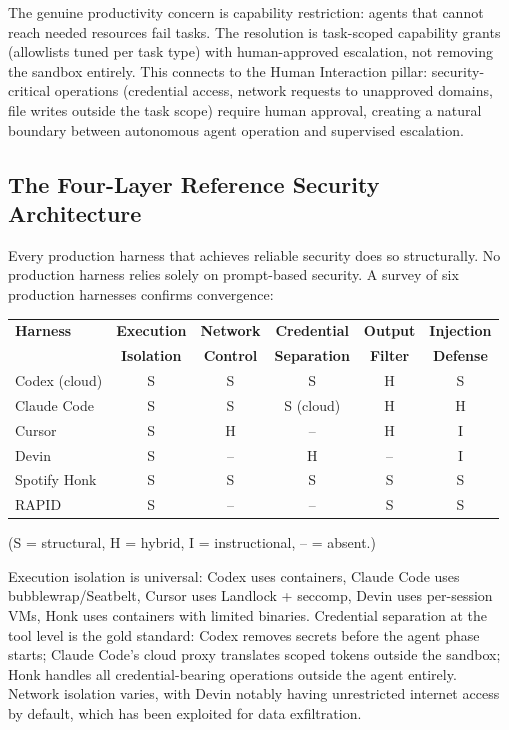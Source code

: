 \documentclass[11pt, a4paper]{googledeepmind}
\begin{document}
The genuine productivity concern is capability restriction: agents that cannot reach needed resources fail tasks. The resolution is task-scoped capability grants (allowlists tuned per task type) with human-approved escalation, not removing the sandbox entirely. This connects to the Human Interaction pillar: security-critical operations (credential access, network requests to unapproved domains, file writes outside the task scope) require human approval, creating a natural boundary between autonomous agent operation and supervised escalation.

\subsection{The Four-Layer Reference Security Architecture}

Every production harness that achieves reliable security does so structurally. No production harness relies solely on prompt-based security. A survey of six production harnesses confirms convergence:

\begin{center}
\small
\begin{tabular}{lccccc}
\toprule
\textbf{Harness} & \textbf{Execution} & \textbf{Network} & \textbf{Credential} & \textbf{Output} & \textbf{Injection} \\
 & \textbf{Isolation} & \textbf{Control} & \textbf{Separation} & \textbf{Filter} & \textbf{Defense} \\
\midrule
Codex (cloud) & S & S & S & H & S \\
Claude Code & S & S & S (cloud) & H & H \\
Cursor & S & H & -- & H & I \\
Devin & S & -- & H & -- & I \\
Spotify Honk & S & S & S & S & S \\
RAPID & S & -- & -- & S & S \\
\bottomrule
\end{tabular}
\end{center}
\noindent\small{(S = structural, H = hybrid, I = instructional, -- = absent.)}

\normalsize
Execution isolation is universal: Codex uses containers, Claude Code uses bubblewrap/Seatbelt, Cursor uses Landlock + seccomp, Devin uses per-session VMs, Honk uses containers with limited binaries. Credential separation at the tool level is the gold standard: Codex removes secrets before the agent phase starts; Claude Code's cloud proxy translates scoped tokens outside the sandbox; Honk handles all credential-bearing operations outside the agent entirely. Network isolation varies, with Devin notably having unrestricted internet access by default, which has been exploited for data exfiltration.
\end{document}
